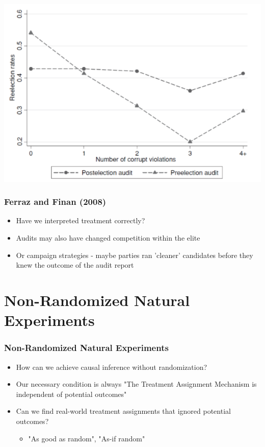 \documentclass[xcolor=x11names,compress]{beamer}\usepackage[]{graphicx}\usepackage[]{color}
\renewcommand{\(}{\begin{columns}}
\renewcommand{\)}{\end{columns}}
\newcommand{\<}[1]{\begin{column}{#1}}
\renewcommand{\>}{\end{column}}
\begin{document}
\begin{frame}
\begin{center}
\includegraphics[scale=0.45]{Chart_FF.png}
\end{center}
\end{frame}

\begin{frame}
\frametitle{Ferraz and Finan (2008)}
\begin{itemize}
\item Have we interpreted treatment correctly?
\pause
\item Audits may also have changed competition within the elite
\pause
\item Or campaign strategies - maybe parties ran 'cleaner' candidates before they knew the outcome of the audit report
\end{itemize}
\end{frame}

\section{Non-Randomized Natural Experiments}

\begin{frame}
\frametitle{Non-Randomized Natural Experiments}
\begin{itemize}
\item How can we achieve causal inference without randomization?
\pause
\item Our necessary condition is always "The Treatment Assignment Mechanism is independent of potential outcomes"
\pause
\item Can we find real-world treatment assignments that ignored potential outcomes?
\begin{itemize}
\pause
\item "As good as random", "As-if random"
\end{itemize}
\end{itemize}
\end{frame}
\end{document}
